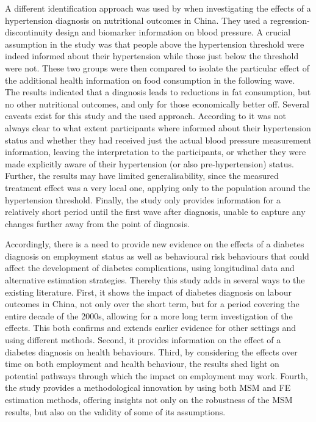 A different identification approach was used by \textcite{Zhao2013a} when investigating the effects of a hypertension diagnosis on nutritional outcomes in China. They used a regression-discontinuity design and biomarker information on blood pressure. A crucial assumption in the study was that people above the hypertension threshold were indeed informed about their hypertension while those just below the threshold were not. These two groups were then compared to isolate the particular effect of the additional health information on food consumption in the following wave. The results indicated that a diagnosis leads to reductions in fat consumption, but no other nutritional outcomes, and only for those economically better off. Several caveats exist for this study and the used approach. According to \textcite{Zhao2013a} it was not always clear to what extent participants where informed about their hypertension status and whether they had received just the actual blood pressure measurement information, leaving the interpretation to the participants, or whether they were made explicitly aware of their hypertension (or also pre-hypertension) status. Further, the results may have limited generalisability, since the measured treatment effect was a very local one, applying only to the population around the hypertension threshold. Finally, the study only provides information for a relatively short period until the first wave after diagnosis, unable to capture any changes further away from the point of diagnosis. 

Accordingly, there is a need to provide new evidence on the effects of a diabetes diagnosis on employment status as well as behavioural risk behaviours that could affect the development of diabetes complications, using longitudinal data and alternative estimation strategies. Thereby this study adds in several ways to the existing literature. First, it shows the impact of diabetes diagnosis on labour outcomes in China, not only over the short term, but for a period covering the entire decade of the 2000s, allowing for a more long term investigation of the effects. This both confirms and extends earlier evidence for other settings and using different methods. Second, it provides information on the effect of a diabetes diagnosis on health behaviours. Third, by considering the effects over time on both employment and health behaviour, the results shed light on potential pathways through which the impact on employment may work.  Fourth, the study provides a methodological innovation by using both \ac{MSM} and \ac{FE} estimation methods, offering insights not only on the robustness of the \ac{MSM} results, but also on the validity of some of its assumptions.  


